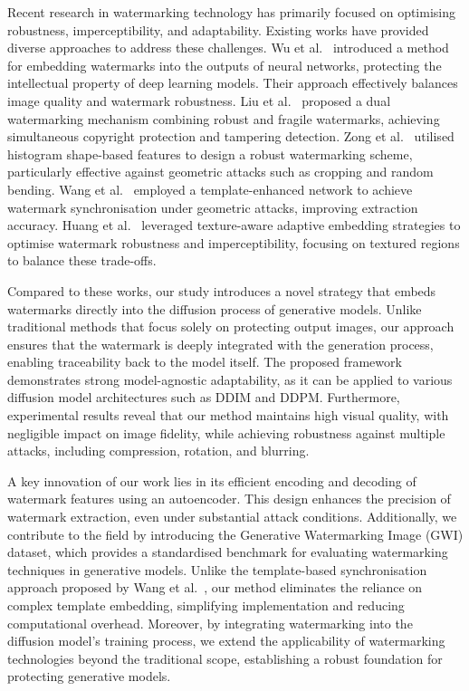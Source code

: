 


Recent research in watermarking technology has primarily focused on optimising robustness, imperceptibility, and adaptability. Existing works have provided diverse approaches to address these challenges. Wu et al.~\cite{wu2021watermarking} introduced a method for embedding watermarks into the outputs of neural networks, protecting the intellectual property of deep learning models. Their approach effectively balances image quality and watermark robustness. Liu et al.~\cite{liu2018blind} proposed a dual watermarking mechanism combining robust and fragile watermarks, achieving simultaneous copyright protection and tampering detection. Zong et al.~\cite{zong2015histogram} utilised histogram shape-based features to design a robust watermarking scheme, particularly effective against geometric attacks such as cropping and random bending. Wang et al.~\cite{wang2024template} employed a template-enhanced network to achieve watermark synchronisation under geometric attacks, improving extraction accuracy. Huang et al.~\cite{huang2023texture} leveraged texture-aware adaptive embedding strategies to optimise watermark robustness and imperceptibility, focusing on textured regions to balance these trade-offs.

Compared to these works, our study introduces a novel strategy that embeds watermarks directly into the diffusion process of generative models. Unlike traditional methods that focus solely on protecting output images, our approach ensures that the watermark is deeply integrated with the generation process, enabling traceability back to the model itself. The proposed framework demonstrates strong model-agnostic adaptability, as it can be applied to various diffusion model architectures such as DDIM and DDPM. Furthermore, experimental results reveal that our method maintains high visual quality, with negligible impact on image fidelity, while achieving robustness against multiple attacks, including compression, rotation, and blurring.

A key innovation of our work lies in its efficient encoding and decoding of watermark features using an autoencoder. This design enhances the precision of watermark extraction, even under substantial attack conditions. Additionally, we contribute to the field by introducing the Generative Watermarking Image (GWI) dataset, which provides a standardised benchmark for evaluating watermarking techniques in generative models. Unlike the template-based synchronisation approach proposed by Wang et al.~\cite{wang2024template}, our method eliminates the reliance on complex template embedding, simplifying implementation and reducing computational overhead. Moreover, by integrating watermarking into the diffusion model's training process, we extend the applicability of watermarking technologies beyond the traditional scope, establishing a robust foundation for protecting generative models.


